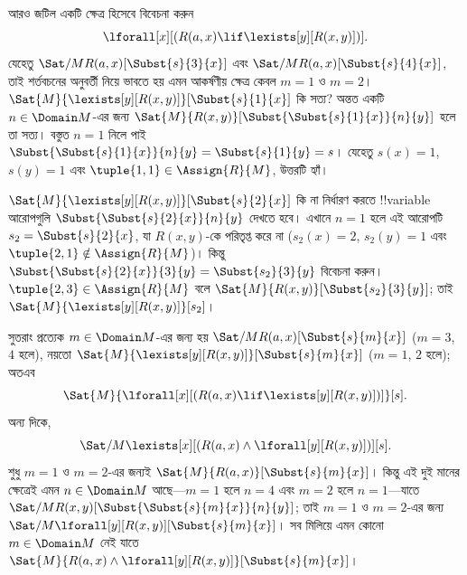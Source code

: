 \documentclass[../../../include/open-logic-section]{subfiles}
\begin{document}
\begin{ex}


আরও জটিল একটি ক্ষেত্র হিসেবে বিবেচনা করুন
\[
\lforall[x][(R(a,x) \lif \lexists[y][R(x,y)])].
\]
যেহেতু $\Sat/{M}{R(a,x)}[\Subst{s}{3}{x}]$ এবং
$\Sat/{M}{R(a,x)}[\Subst{s}{4}{x}]$, তাই শর্তবচনের অনুবর্তী নিয়ে
ভাবতে হয় এমন আকর্ষণীয় ক্ষেত্র কেবল $m = 1$ ও $m = 2$।
$\Sat{M}{\lexists[y][R(x,y)]}[\Subst{s}{1}{x}]$ কি সত্য? অন্তত একটি
$n \in \Domain M$-এর জন্য
$\Sat{M}{R(x,y)}[\Subst{\Subst{s}{1}{x}}{n}{y}]$ হলে তা সত্য। বস্তুত
$n = 1$ নিলে পাই $\Subst{\Subst{s}{1}{x}}{n}{y} =
\Subst{s}{1}{y} = s$। যেহেতু $s(x) = 1$, $s(y) = 1$ এবং
$\tuple{1,1} \in \Assign{R}{M}$, উত্তরটি হ্যাঁ।


$\Sat{M}{\lexists[y][R(x,y)]}[\Subst{s}{2}{x}]$ কি না নির্ধারণ করতে
!!{variable} আরোপগুলি $\Subst{\Subst{s}{2}{x}}{n}{y}$ দেখতে হবে।
এখানে $n = 1$ হলে এই আরোপটি~$s_2 = \Subst{s}{2}{x}$, যা $R(x,y)$-কে
পরিতৃপ্ত করে না ($s_2(x) = 2$, $s_2(y) = 1$ এবং
$\tuple{2,1}\notin \Assign{R}{M}$)। কিন্তু
$\Subst{\Subst{s}{2}{x}}{3}{y} = \Subst{s_2}{3}{y}$ বিবেচনা করুন।
$\tuple{2,3} \in \Assign{R}{M}$ বলে
$\Sat{M}{R(x,y)}[\Subst{s_2}{3}{y}]$; তাই
$\Sat{M}{\lexists[y][R(x,y)]}[s_2]$।

সুতরাং প্রত্যেক $m \in \Domain M$-এর জন্য হয়
$\Sat/{M}{R(a,x)}[\Subst{s}{m}{x}]$ ($m = 3$, $4$ হলে), নয়তো
$\Sat{M}{\lexists[y][R(x,y)]}[\Subst{s}{m}{x}]$ ($m = 1$, $2$ হলে);
অতএব
\[
\Sat{M}{\lforall[x][(R(a,x) \lif \lexists[y][R(x,y)])]}[s].
\]
অন্য দিকে,
\[
\Sat/{M}{\lexists[x][(R(a,x) \land \lforall[y][R(x,y)])]}[s].
\]
শুধু $m = 1$ ও $m = 2$-এর জন্যই
$\Sat{M}{R(a,x)}[\Subst{s}{m}{x}]$। কিন্তু এই দুই মানের ক্ষেত্রেই
এমন $n \in \Domain M$ আছে—$m=1$ হলে $n=4$ এবং $m=2$ হলে $n=1$—যাতে
$\Sat/{M}{R(x,y)}[\Subst{\Subst{s}{m}{x}}{n}{y}]$; তাই $m = 1$ ও
$m = 2$-এর জন্য $\Sat/{M}{\lforall[y][R(x,y)]}[\Subst{s}{m}{x}]$।
সব মিলিয়ে এমন কোনো $m \in \Domain M$ নেই যাতে
$\Sat{M}{R(a,x) \land \lforall[y][R(x,y)]}[\Subst{s}{m}{x}]$।

\end{ex}
\end{document}

